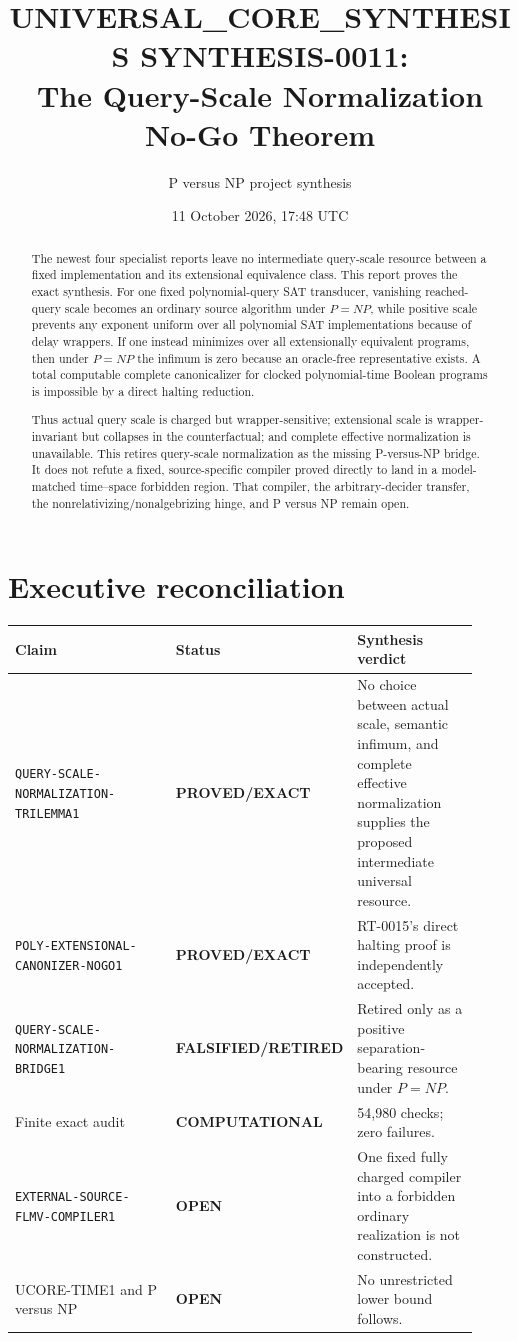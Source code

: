 \documentclass[11pt]{article}
\title{UNIVERSAL\_CORE\_SYNTHESIS SYNTHESIS-0011:\\
The Query-Scale Normalization No-Go Theorem}
\author{P versus NP project synthesis}
\date{11 October 2026, 17:48 UTC}
\newcommand{\EXACT}{\textbf{PROVED/EXACT}}
\newcommand{\OPEN}{\textbf{OPEN}}
\newcommand{\RETIRED}{\textbf{FALSIFIED/RETIRED}}
\newcommand{\COMP}{\textbf{COMPUTATIONAL}}
\begin{document}
\maketitle

\begin{abstract}
The newest four specialist reports leave no intermediate query-scale resource
between a fixed implementation and its extensional equivalence class.  This
report proves the exact synthesis.  For one fixed polynomial-query SAT
transducer, vanishing reached-query scale becomes an ordinary source
algorithm under $P=NP$, while positive scale prevents any exponent uniform
over all polynomial SAT implementations because of delay wrappers.  If one
instead minimizes over all extensionally equivalent programs, then under
$P=NP$ the infimum is zero because an oracle-free representative exists.  A
total computable complete canonicalizer for clocked polynomial-time Boolean
programs is impossible by a direct halting reduction.

Thus actual query scale is charged but wrapper-sensitive; extensional scale
is wrapper-invariant but collapses in the counterfactual; and complete
effective normalization is unavailable.  This retires query-scale
normalization as the missing P-versus-NP bridge.  It does not refute a fixed,
source-specific compiler proved directly to land in a model-matched
time--space forbidden region.  That compiler, the arbitrary-decider transfer,
the nonrelativizing/nonalgebrizing hinge, and P versus NP remain open.
\end{abstract}

\section{Executive reconciliation}

\begin{center}\small
\begin{tabular}{@{}p{0.43\linewidth}p{0.19\linewidth}p{0.30\linewidth}@{}}
\toprule
Claim & Status & Synthesis verdict\\ \midrule
\texttt{QUERY-SCALE-NORMALIZATION-TRILEMMA1} & \EXACT &
No choice between actual scale, semantic infimum, and complete effective
normalization supplies the proposed intermediate universal resource.\\
\texttt{POLY-EXTENSIONAL-CANONIZER-NOGO1} & \EXACT &
RT-0015's direct halting proof is independently accepted.\\
\texttt{QUERY-SCALE-NORMALIZATION-BRIDGE1} & \RETIRED &
Retired only as a positive separation-bearing resource under $P=NP$.\\
Finite exact audit & \COMP & 54,980 checks; zero failures.\\
\texttt{EXTERNAL-SOURCE-FLMV-COMPILER1} & \OPEN &
One fixed fully charged compiler into a forbidden ordinary realization is not constructed.\\
UCORE-TIME1 and P versus NP & \OPEN & No unrestricted lower bound follows.\\
\bottomrule
\end{tabular}
\end{center}
\end{document}
